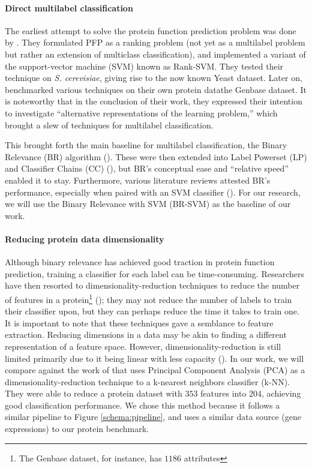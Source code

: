 \paragraph{Direct multilabel classification}
The earliest attempt to solve the protein function prediction problem was
done by \cite{elisseeff2001kernel}. They formulated PFP as a ranking problem
(not yet as a multilabel problem but rather an extension of multiclass
classification), and implemented a variant of the support-vector machine
(SVM) known as Rank-SVM. They tested their technique on \textit{S.
cerevisiae}, giving rise to the now known Yeast dataset. Later on,
\cite{diplaris2005protein} benchmarked various techniques on their own
protein data\textemdash the Genbase dataset. It is noteworthy that in the
conclusion of their work, they expressed their intention to investigate
``alternative representations of the learning problem,'' which brought a slew
of techniques for multilabel classification.

\par This brought forth the main baseline for multilabel classification, the
Binary Relevance (BR) algorithm
(\cite{godbole2004discriminative,tsoumakas2007multilabel}). These were then
extended into Label Powerset (LP) and Classifier Chains (CC)
(\cite{read2009classifier}), but BR's conceptual ease and ``relative speed''
enabled it to stay. Furthermore, various literature reviews attested BR's
performance, especially when paired with an SVM classifier
(\cite{luaces2012binary, zhang2014review,tsoumakas2017data}). For our
research, we will use the Binary Relevance with SVM (BR-SVM) as the baseline
of our work.

\paragraph{Reducing protein data dimensionality}
Although binary relevance has achieved good traction in protein function
prediction, training a classifier for each label can be time-consuming.
Researchers have then resorted to dimensionality-reduction techniques to
reduce the number of features in a protein\footnote{The Genbase dataset, for
instance, has $1186$ attributes} (\cite{wang2009using, wang2013protein,
wang2017protein}); they may not reduce the number of labels to train their
classifier upon, but they can perhaps reduce the time it takes to train one.
It is important to note that these techniques gave a semblance to feature
extraction. Reducing dimensions in a data may be akin to finding a different
representation of a feature space. However, dimensionality-reduction is still
limited primarily due to it being linear with less capacity
(\cite{cunningham2015linear}). In our work, we will compare against the work
of \cite{wang2013protein} that uses Principal Component Analysis (PCA) as a
dimensionality-reduction technique to a k-nearest neighbors classifier
(k-NN). They were able to reduce a protein dataset with $353$ features into
$204$, achieving good classification performance. We chose this method
because it follows a similar pipeline to Figure \ref{schema:pipeline}, and
uses a similar data source (gene expressions) to our protein benchmark.

